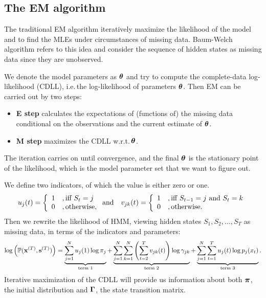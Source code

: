 \subsection{The EM algorithm}
\label{sec:HMM:EM:algo}
The traditional EM algorithm iteratively maximize the likelihood of the model
and to find the MLEs under circumstances of missing data.
Baum-Welch algorithm refers to this idea and consider the sequence of hidden states
as missing data since they are unobserved.

We denote the model parameters as ${\boldsymbol\theta}$ and try to compute the 
complete-data log-likelihood (CDLL),
i.e.\,the log-likelihood of parameters ${\boldsymbol\theta}$.
Then EM can be carried out by two steps:
		\begin{itemize}
		\item \textbf{E step} calculates the expectations of (functions of) the missing data 
		conditional on the observations and the current estimate of ${\boldsymbol\theta}$.
		\item \textbf{M step} maximizes the CDLL w.r.t.\,${\boldsymbol\theta}$.
		\end{itemize}
The iteration carries on until convergence,
and the final ${\boldsymbol\theta}$ is the stationary point of the likelihood,
which is the model parameter set that we want to figure out.

We define two indicators, of which the value is either zero or one.
		\begin{equation}
		\label{eq:HMM:EM:indicator}
		u_j(t) = \left \{ \begin{array}{l l}
		1 & ,\text{iff}\ S_t = j \\
		0 & ,\text{otherwise}, \\
		\end{array} \right.
		\text{and}\quad
		v_{jk}(t) = \left \{ \begin{array}{l l}
		1 & ,\text{iff}\ S_{t-1} = j\ \text{and}\ S_t = k \\
		0 & ,\text{otherwise}. \\
		\end{array} \right.
		\end{equation}
Then we rewrite the likelihood of HMM,
viewing hidden states $S_1,S_2,\dots,S_T$ as missing data,
in terms of the indicators and parameters:
		\begin{equation}
		\label{eq:HMM:EM:CDLL}
		\log\left(\mathbb{P}({\mathbf x}^{(T)},{\mathbf s}^{(T)})\right) = 
		\underbrace{\sum_{j=1}^{N} u_j(1)\log\pi_j}_{\text{term 1}} + 
		\underbrace{\sum_{j=1}^{N}\sum_{k=1}^{N} \left(\sum_{t=2}^Tv_{jk}(t)\right)\log\gamma_{jk}}
			_{\text{term 2}} + 
		\underbrace{\sum_{j=1}^{N}\sum_{t=1}^{T} u_j(t)\log p_j(x_t)}_{\text{term 3}}.
        \end{equation}
Iterative maximization of the CDLL will provide us information about 
both ${\boldsymbol\pi}$, the initial distribution and ${\boldsymbol\Gamma}$, the state transition matrix.

